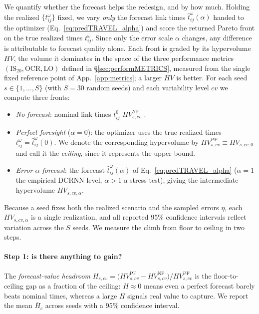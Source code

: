 \documentclass[a4paper,fleqn]{cas-sc}
\begin{document}
We quantify whether the forecast helps the redesign, and by how much. Holding the realized  $\{t_{ij}^{\omega}\}$ fixed, we vary \emph{only} the forecast link times $\hat{t}_{ij}^{\omega}(\alpha)$ handed to the optimizer (Eq.~\eqref{eq:predTRAVEL_alpha}) and score the returned Pareto front on the true realized times $t_{ij}^{\omega}$. Since only the error scale $\alpha$ changes, any difference is attributable to forecast quality alone. Each front is graded by its hypervolume $HV$, the volume it dominates in the space of the three performance metrics $(\mathrm{IS}_{20},\mathrm{OCR},\mathrm{LO})$ defined in \S\ref{sec:performMETRICS}, measured from the single fixed reference point of App.~\ref{app:metrics}; a larger $HV$ is better. For each seed $s\in\{1,\dots,S\}$ (with $S=30$ random seeds) and each variability level $\textit{cv}$ we compute three fronts:
\begin{itemize}
    \item \emph{No forecast}:  nominal link times $t_{ij}^{0}$ $HV^{\mathrm{NF}}_{s,\textit{cv}}$ .

    \item \emph{Perfect foresight} ($\alpha=0$): the optimizer uses the true realized times $t_{ij}^{\omega}=\hat{t}_{ij}^{\omega}(0)$. We denote the corresponding hypervolume by $HV^{\mathrm{PF}}_{s,\textit{cv}}\equiv HV_{s,\textit{cv},0}$ and call it the \emph{ceiling}, since it represents the upper bound.

    \item \emph{Error-$\alpha$ forecast}: the forecast $\hat{t}_{ij}^{\omega}(\alpha)$ of Eq.~\eqref{eq:predTRAVEL_alpha} ($\alpha=1$ the empirical DCRNN level, $\alpha>1$ a stress test), giving the intermediate hypervolume $HV_{s,\textit{cv},\alpha}$.
\end{itemize}
Because a seed fixes both the realized scenario and the sampled errors $\eta$, each $HV_{s,\textit{cv},\alpha}$ is a single realization, and all reported 95\% confidence intervals reflect variation across the $S$ seeds. We measure the climb from floor to ceiling in two steps.

\paragraph{Step 1: is there anything to gain?} The \emph{forecast-value headroom} $H_{s,\textit{cv}}=\bigl(HV^{\mathrm{PF}}_{s,\textit{cv}}-HV^{\mathrm{NF}}_{s,\textit{cv}}\bigr)/HV^{\mathrm{PF}}_{s,\textit{cv}}$ is the floor-to-ceiling gap as a fraction of the ceiling: $H\approx0$ means even a perfect forecast barely beats nominal times, whereas a large $H$ signals real value to capture. We report the mean $\bar H_c$ across seeds with a 95\% confidence interval.
\end{document}
